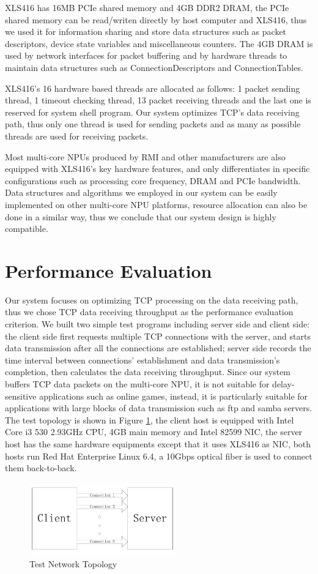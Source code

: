 \documentclass[conference]{IEEEtran}
\begin{document}
XLS416 has 16MB PCIe shared memory and 4GB DDR2 DRAM, the PCIe shared memory can be read/writen directly by host computer and XLS416, thus we used it for information sharing and store data structures such as packet descriptors, device state variables and miscellaneous counters. The 4GB DRAM is used by network interfaces for packet buffering and by hardware threads to maintain data structures such as ConnectionDescriptors and ConnectionTables.

XLS416's 16 hardware based threads are allocated as follows: 1 packet sending thread, 1 timeout checking thread, 13 packet receiving threads and the last one is reserved for system shell program. Our system optimizes TCP's data receiving path, thus only one thread is used for sending packets and as many as possible threads are used for receiving packets.

Most multi-core NPUs produced by RMI and other manufacturers are also equipped with XLS416's key hardware features, and only differentiates in specific configurations such as processing core frequency, DRAM and PCIe bandwidth. Data structures and algorithms we employed in our system can be easily implemented on other multi-core NPU platforms, resource allocation can also be done in a similar way, thus we conclude that our system design is highly compatible.
\section{Performance Evaluation}
Our system focuses on optimizing TCP processing on the data receiving path, thus we chose TCP data receiving throughput as the performance evaluation criterion. We built two simple test programs including server side and client side: the client side first requests multiple TCP connections with the server, and starts data transmission after all the connections are established; server side records the time interval between connections' establishment and data transmission's completion, then calculates the data receiving throughput. Since our system buffers TCP data packets on the multi-core NPU, it is not suitable for delay-sensitive applications such as online games, instead, it is particularly suitable for applications with large blocks of data transmission such as ftp and samba servers. The test topology is shown in Figure \ref{test_topology}, the client host is equipped with Intel Core i3 530 2.93GHz CPU, 4GB main memory and Intel 82599 NIC, the server host has the same hardware equipments except that it uses XLS416 as NIC, both hosts run Red Hat Enterprise Linux 6.4, a 10Gbps optical fiber is used to connect them back-to-back.
\begin{figure}[!t]
\centering
\includegraphics[width=2.5in]{test_topology}
\caption{Test Network Topology}
\label{test_topology}
\end{figure}
\end{document}
